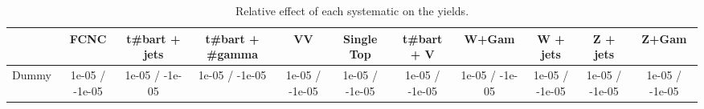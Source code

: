 \begin{table}[htbp]
\begin{center}
\footnotesize
\begin{tabular}{|c|c|c|c|c|c|c|c|c|c|c|}
\hline 
      & FCNC      & t#bar{t} + jets      & t#bar{t} +  #gamma      & VV      & Single Top      & t#bar{t} + V      & W+Gam      & W + jets      & Z + jets      & Z+Gam \\ 
\hline 
  Dummy & 1e-05 / -1e-05 & 1e-05 / -1e-05 & 1e-05 / -1e-05 & 1e-05 / -1e-05 & 1e-05 / -1e-05 & 1e-05 / -1e-05 & 1e-05 / -1e-05 & 1e-05 / -1e-05 & 1e-05 / -1e-05 & 1e-05 / -1e-05 \\ 
\hline 
\end{tabular} 
\caption{Relative effect of each systematic on the yields.} 
\end{center} 
\end{table} 
